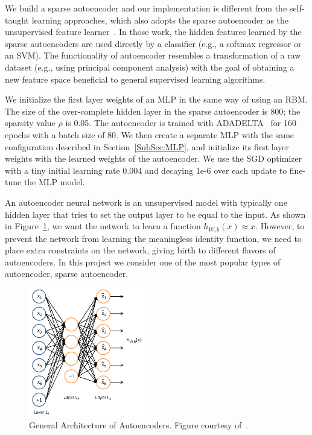We build a sparse autoencoder and our implementation is different from the
self-taught learning approaches, which also adopts the sparse autoencoder as the unsupervised feature learner~\cite{STL-NIDS, SparseAE}.
In those work, the hidden features learned by the sparse autoencoders are used directly by a classifier (e.g., a softmax regressor or an SVM).
The functionality of autoencoder resembles a transformation of a raw dataset (e.g., using principal component analysis) with the goal of obtaining a new feature space beneficial to general supervised learning algorithms.

We initialize the first layer weights of an MLP in the same way of using an RBM.
The size of the over-complete hidden layer in the sparse autoencoder is 800; the sparsity value $\rho$ is 0.05. The autoencoder is trained with ADADELTA~\cite{ADADELTA} for 160 epochs with a batch size of 80.
We then create a separate MLP with the same configuration described in Section~\ref{SubSec:MLP}, and initialize its first layer weights with the learned weights of the autoencoder.
We use the SGD optimizer with a tiny initial learning rate 0.004
and decaying 1e-6 over each update to fine-tune the MLP model.

\iffalse
An autoencoder neural network is an unsupervised model with typically one hidden layer that
tries to set the output layer to be equal to the input.
As shown in Figure~\ref{Fig:AEArchitecture}, we want the network to
learn a function $h_{W, b}(x) \approx x$.
However, to prevent the network from learning the meaningless identity function,
we need to place extra constraints on the network, giving birth to different
flavors of autoencoders.
In this project we consider one of the most popular types of autoencoder, sparse autoencoder.

\begin{figure}[h]
    \centering
    \includegraphics[width=0.45\textwidth]{figures/autoencoder.png}
    \caption{General Architecture of Autoencoders.
        Figure courtesy of~\cite{UFLDLAutoencoder}.}
    \label{Fig:AEArchitecture}
\end{figure}

